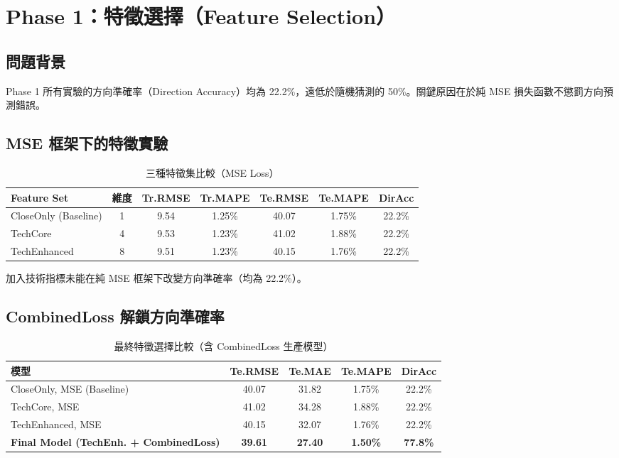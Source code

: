 \documentclass[12pt,a4paper]{article}
\begin{document}
\section{Phase 1：特徵選擇（Feature Selection）}

\subsection{問題背景}

Phase 1 所有實驗的方向準確率（Direction Accuracy）均為 22.2\%，遠低於隨機猜測的 50\%。關鍵原因在於純 MSE 損失函數不懲罰方向預測錯誤。

\subsection{MSE 框架下的特徵實驗}

\begin{table}[H]
\centering
\caption{三種特徵集比較（MSE Loss）}
\begin{tabular}{lcccccc}
\toprule
\textbf{Feature Set} & \textbf{維度} & \textbf{Tr.RMSE} & \textbf{Tr.MAPE} & \textbf{Te.RMSE} & \textbf{Te.MAPE} & \textbf{DirAcc} \\
\midrule
CloseOnly (Baseline) & 1 & 9.54 & 1.25\% & 40.07 & 1.75\% & 22.2\% \\
TechCore             & 4 & 9.53 & 1.23\% & 41.02 & 1.88\% & 22.2\% \\
TechEnhanced         & 8 & 9.51 & 1.23\% & 40.15 & 1.76\% & 22.2\% \\
\bottomrule
\end{tabular}
\end{table}

加入技術指標未能在純 MSE 框架下改變方向準確率（均為 22.2\%）。

\subsection{CombinedLoss 解鎖方向準確率}

\begin{table}[H]
\centering
\caption{最終特徵選擇比較（含 CombinedLoss 生產模型）}
\begin{tabular}{lcccc}
\toprule
\textbf{模型} & \textbf{Te.RMSE} & \textbf{Te.MAE} & \textbf{Te.MAPE} & \textbf{DirAcc} \\
\midrule
CloseOnly, MSE (Baseline) & 40.07 & 31.82 & 1.75\% & 22.2\% \\
TechCore, MSE             & 41.02 & 34.28 & 1.88\% & 22.2\% \\
TechEnhanced, MSE         & 40.15 & 32.07 & 1.76\% & 22.2\% \\
\rowcolor{bestrow}
\textbf{Final Model (TechEnh. + CombinedLoss)} & \textbf{39.61} & \textbf{27.40} & \textbf{1.50\%} & \textbf{77.8\%} \\
\bottomrule
\end{tabular}
\end{table}
\end{document}
